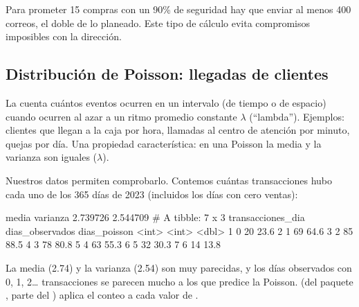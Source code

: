 Para prometer 15 compras con un 90\% de seguridad hay que enviar al menos 400
correos, el doble de lo planeado. Este tipo de cálculo evita compromisos
imposibles con la dirección.

\subsection{Distribución de Poisson: llegadas de clientes}

La  cuenta cuántos eventos ocurren en un
intervalo (de tiempo o de espacio) cuando ocurren al azar a un ritmo
promedio constante $\lambda$ (``lambda''). Ejemplos: clientes que llegan a
la caja por hora, llamadas al centro de atención por minuto, quejas por día.
Una propiedad característica: en una Poisson la media y la varianza son
iguales ($\lambda$).

Nuestros datos permiten comprobarlo. Contemos cuántas transacciones hubo
cada uno de los 365 días de 2023 (incluidos los días con cero ventas):

\begin{rsalida}
   media varianza
2.739726 2.544709
# A tibble: 7 x 3
  transacciones_dia dias_observados dias_poisson
              <int>           <int>        <dbl>
1                 0              20         23.6
2                 1              69         64.6
3                 2              85         88.5
4                 3              78         80.8
5                 4              63         55.3
6                 5              32         30.3
7                 6              14         13.8
\end{rsalida}

La media (2.74) y la varianza (2.54) son muy parecidas, y los días
observados con 0, 1, 2\ldots{} transacciones se parecen mucho a los que
predice la Poisson.  (del paquete , parte
del ) aplica el conteo a cada valor de
.

